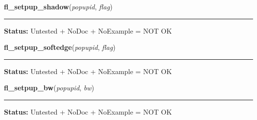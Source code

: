     \vspace{0.5ex}

\hspace{.8\funcindent}\begin{boxedminipage}{\funcwidth}

    \raggedright \textbf{fl\_setpup\_shadow}(\textit{popupid}, \textit{flag})

    \vspace{-1.5ex}

    \rule{\textwidth}{0.5\fboxrule}
\setlength{\parskip}{2ex}
\setlength{\parskip}{1ex}
\textbf{Status:} Untested + NoDoc + NoExample = NOT OK



    \end{boxedminipage}

    \label{xformslib:library:fl_setpup_softedge}

    \vspace{0.5ex}

\hspace{.8\funcindent}\begin{boxedminipage}{\funcwidth}

    \raggedright \textbf{fl\_setpup\_softedge}(\textit{popupid}, \textit{flag})

    \vspace{-1.5ex}

    \rule{\textwidth}{0.5\fboxrule}
\setlength{\parskip}{2ex}
\setlength{\parskip}{1ex}
\textbf{Status:} Untested + NoDoc + NoExample = NOT OK



    \end{boxedminipage}

    \label{xformslib:library:fl_setpup_bw}

    \vspace{0.5ex}

\hspace{.8\funcindent}\begin{boxedminipage}{\funcwidth}

    \raggedright \textbf{fl\_setpup\_bw}(\textit{popupid}, \textit{bw})

    \vspace{-1.5ex}

    \rule{\textwidth}{0.5\fboxrule}
\setlength{\parskip}{2ex}
\setlength{\parskip}{1ex}
\textbf{Status:} Untested + NoDoc + NoExample = NOT OK



    \end{boxedminipage}

